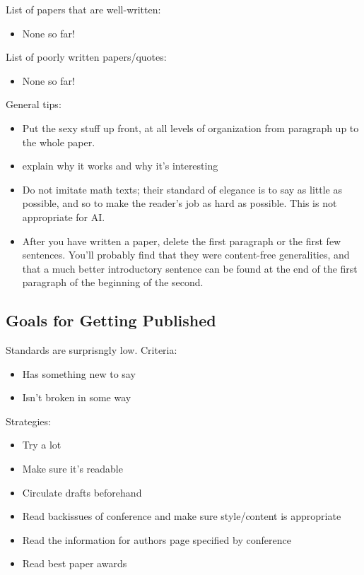List of papers that are well-written:
\begin{itemize}
\item None so far!
\end{itemize}

List of poorly written papers/quotes:
\begin{itemize}
\item None so far!
\end{itemize}

General tips:
\begin{itemize}
\item Put the sexy stuff up front, at all levels of organization from paragraph
up to the whole paper.
\item explain why it works and why it’s interesting
\item Do not imitate math texts; their standard of elegance is to say as little
as possible, and so to make the reader’s job as hard as possible. This is not
appropriate for AI.
\item After you have written a paper, delete the first paragraph or the first few
sentences. You’ll probably find that they were content-free generalities, and
that a much better introductory sentence can be found at the end of the
first paragraph of the beginning of the second.
\end{itemize}

\subsection{Goals for Getting Published}
Standards are surprisngly low.
Criteria:
\begin{itemize}
\item Has something new to say
\item Isn't broken in some way
\end{itemize}

Strategies:
\begin{itemize}
\item Try a lot
\item Make sure it's readable
\item Circulate drafts beforehand
\item Read backissues of conference and make sure style/content is appropriate
\item Read the information for authors page specified by conference
\item Read best paper awards
\end{itemize}

